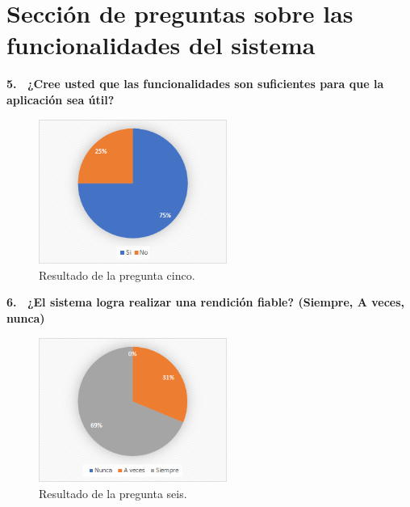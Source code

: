 \section{Sección de preguntas sobre las funcionalidades del sistema}

\textbf{5.  ¿Cree usted que las funcionalidades son suficientes para que la aplicación sea útil?}

\begin{figure}[h!]
    \centering
    \includegraphics[width=0.55\textwidth]{Imagenes/Pregunta5.png}
    \caption{\label{fig: Pregunta5}Resultado de la pregunta cinco.}
\end{figure}

\textbf{6.  ¿El sistema logra realizar una rendición fiable? (Siempre, A veces, nunca)}

\begin{figure}[h!]
    \centering
    \includegraphics[width=0.55\textwidth]{Imagenes/Pregunta6.png}
    \caption{\label{fig: Pregunta6}Resultado de la pregunta seis.}
\end{figure}